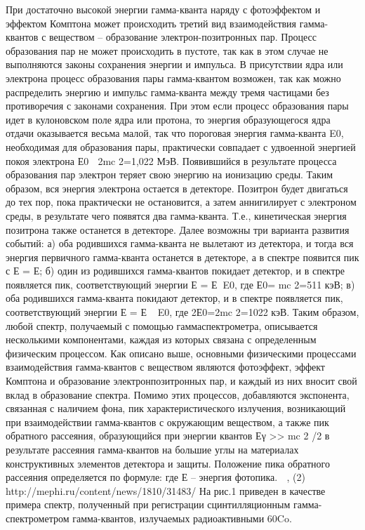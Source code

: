 При достаточно высокой энергии гамма-кванта наряду с фотоэффектом и эффектом
Комптона может происходить третий вид взаимодействия гамма-квантов с веществом –
образование электрон-позитронных пар. Процесс образования пар не может
происходить в пустоте, так как в этом случае не выполняются законы сохранения
энергии и импульса. В присутствии ядра или электрона процесс образования пары
гамма-квантом возможен, так как можно распределить энергию и импульс
гамма-кванта между тремя частицами без противоречия с законами сохранения. При
этом если процесс образования пары идет в кулоновском поле ядра или протона, то
энергия образующегося ядра отдачи оказывается весьма малой, так что пороговая
энергия гамма-кванта E0, необходимая для образования пары, практически совпадает
с удвоенной энергией покоя электрона Е0  2mc 2=1,022 МэВ. Появившийся в
результате процесса образования пар электрон теряет свою энергию на ионизацию
среды. Таким образом, вся энергия электрона остается в детекторе. Позитрон будет
двигаться до тех пор, пока практически не остановится, а затем аннигилирует с
электроном среды, в результате чего появятся два гамма-кванта. Т.е.,
кинетическая энергия позитрона также останется в детекторе. Далее возможны три
варианта развития событий: а) оба родившихся гамма-кванта не вылетают из
детектора, и тогда вся энергия первичного гамма-кванта останется в детекторе, а
в спектре появится пик с Е = Е; б) один из родившихся гамма-квантов покидает
детектор, и в спектре появляется пик, соответствующий энергии Е = ЕE0, где
Е0= mc 2=511 кэВ; в) оба родившихся гамма-кванта покидают детектор, и в спектре
появляется пик, соответствующий энергии Е = ЕE0, где 2Е0=2mc 2=1022 кэВ.
Таким образом, любой спектр, получаемый с помощью гаммаспектрометра, описывается
несколькими компонентами, каждая из которых связана с определенным физическим
процессом. Как описано выше, основными физическими процессами взаимодействия
гамма-квантов с веществом являются фотоэффект, эффект Комптона и образование
электронпозитронных пар, и каждый из них вносит свой вклад в образование
спектра. Помимо этих процессов, добавляются экспонента, связанная с наличием
фона, пик характеристического излучения, возникающий при взаимодействии
гамма-квантов с окружающим веществом, а также пик обратного рассеяния,
образующийся при энергии квантов Еγ >> mc 2 /2 в результате рассеяния
гамма-квантов на большие углы на материалах конструктивных элементов детектора и
защиты. Положение пика обратного рассеяния определяется по формуле: где Е –
энергия фотопика.  , (2) http://mephi.ru/content/news/1810/31483/ На рис.1
приведен в качестве примера спектр, полученный при регистрации сцинтилляционным
гамма-спектрометром гамма-квантов, излучаемых радиоактивными 60Co.

